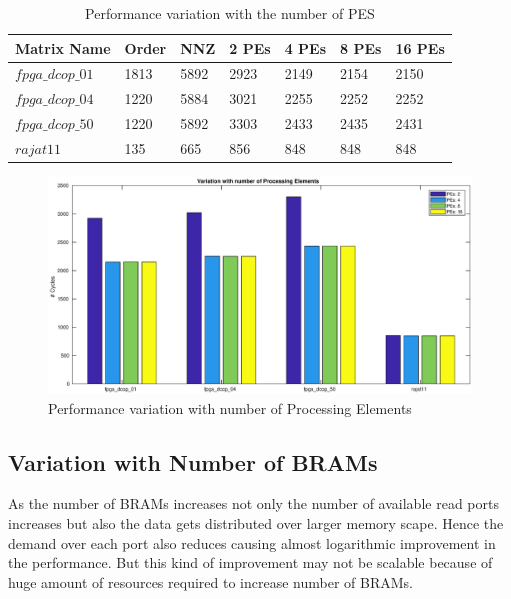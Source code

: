 \begin{table}[H]
    \centering
    \caption{Performance variation with the number of PES}
    \label{tab:res:peVar:data}
    \begin{tabular}{l l l l l l l} 
        \toprule
        Matrix Name & Order  & NNZ & 2 PEs & 4 PEs & 8 PEs & 16 PEs \\
        \midrule
        $fpga\_dcop\_01$ & 1813 & 5892 &         2923   &     2149    &    2154  &      2150   \\
        $fpga\_dcop\_04$ & 1220 & 5884 &         3021   &     2255    &    2252  &      2252   \\
        $fpga\_dcop\_50$ & 1220 & 5892 &         3303   &     2433    &    2435  &      2431   \\
        $rajat11$      & 135    &  665 &          856   &      848    &     848  &       848    \\
        \bottomrule
    \end{tabular}
\end{table}



\begin{figure}[H]
    \centering
    \includegraphics[width = \textwidth]{./Results/peVar.eps}
    \caption{Performance variation with number of Processing Elements}
    \label{fig:res:peVar:plot}
\end{figure}







\subsection{Variation with Number of BRAMs}

As the number of BRAMs increases not only the number of 
available read ports increases but also the data gets distributed over larger 
memory scape. Hence the demand over each port also reduces causing almost logarithmic
improvement in the performance. But this kind of improvement may not be scalable
because of huge amount of resources required to increase number of BRAMs.

